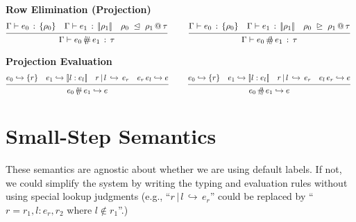 \documentclass{article}
\makeatletter
\newcommand{\ignore}[1]{}
\newcommand{\define}{::=}
\newcommand{\G}{\Gamma}
\newcommand{\variant}[1]{[\!|#1|\!]}
\newcommand{\app}[2]{#1\,#2}
\newcommand{\hastp}[3]{#1 \vdash #2 \,:\, #3}
\newcommand{\projFun}{\,\langle\!\!\#\,}
\newcommand{\projArg}{\,\#\!\!\rangle\,}
\newcommand{\projFunRule}[3]{#1 \;\trianglelefteq\; #2 \,@\, #3}
\newcommand{\projArgRule}[3]{#1 \;\trianglerighteq\; #2 \,@\, #3}
\newcommand{\haslbltm}[3]{#1\,|\,#2\,\hookrightarrow\, #3}
\newcommand{\eval}[2]{#1 \hookrightarrow #2}
\newcommand{\deduct}[3][]
{
  \begin{prooftree}
    \hypo{#2}
    \infer1[\text{#1}]{#3}
  \end{prooftree}
}
\makeatother
\begin{document}
\ignore{
\noindent
\textbf{New types}
\[\begin{array}{rcl}
\sigma & \define & \alpha \mid \forall \alpha. \sigma \mid \tau\to\tau
\end{array}
\]

\noindent
\textbf{Records}
\[
\deduct
    {}
    {\hastp{\G}{\{\cdot\}}{\{\cdot\}}}
    {}
\qquad
\deduct
    {\hastp{\G}{e}{\sigma}}
    {\hastp{\G}{\{\_:e\}}{\{\_:\sigma\}}}
    {}
\qquad
\deduct
    {\hastp{\G}{e}{\sigma}
      \quad
      \hastp{\G}{\{r\}}{\{\rho\}}
    }
    {\hastp{\G}{\{l:e,r\}}{\{l:\sigma,\rho\}}}
    {}
\]
}



\noindent
\textbf{Row Elimination (Projection)}
\[
\deduct
    {\hastp{\G}{e_0}{\{\rho_0\}}
     \quad
     \hastp{\G}{e_1}{\variant{\rho_1}}
     \quad
     \projFunRule{\rho_0}{\rho_1}{\tau}
    }
    {\hastp{\G}{e_0\projFun e_1}{\tau}}
    {}
\qquad
\deduct
    {\hastp{\G}{e_0}{\{\rho_0\}}
     \quad
     \hastp{\G}{e_1}{\variant{\rho_1}}
     \quad
     \projArgRule{\rho_0}{\rho_1}{\tau}
    }
    {\hastp{\G}{e_0\projArg e_1}{\tau}}
    {}
\]

\noindent
\textbf{Projection Evaluation}
\[
\deduct
    {\eval{e_0}{\{r\}}
     \quad
     \eval{e_1}{\variant{l:e_l}}
     \quad
     \haslbltm{r}{l}{e_r}
     \quad
     \eval{\app{e_r}{e_l}}{e}
    }
    {\eval{e_0\projFun e_1}{e}}
    {}
\qquad
\deduct
    {\eval{e_0}{\{r\}}
     \quad
     \eval{e_1}{\variant{l:e_l}}
     \quad
     \haslbltm{r}{l}{e_r}
     \quad
     \eval{\app{e_l}{e_r}}{e}
    }
    {\eval{e_0\projArg e_1}{e}}
    {}
\]

\section{Small-Step Semantics}

These semantics are agnostic about whether we are using default labels. If not, we could simplify
the system by writing the typing and evaluation rules without using special lookup judgments
(e.g., ``$\haslbltm{r}{l}{e_r}$'' could be replaced by ``$r = r_1, l{:}e_r, r_2$ where $l\not\in r_1$''.)
\end{document}
